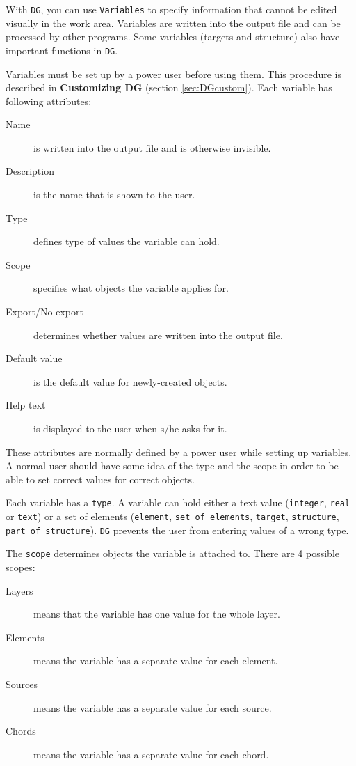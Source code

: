 \documentclass[a4paper,10pt]{report}
\begin{document}
With {\tt DG}, you can use {\tt Variables} to specify information that cannot be
edited visually in the work area. Variables are written into the
output file and can be processed by other programs. Some variables
(targets and structure) also have important functions in {\tt DG}.

Variables must be set up by a power user before using them. This
procedure is described in {\bf Customizing DG} (section \ref{sec:DGcustom}). Each variable has
following attributes:
\begin{description}
\item[Name] is written into the output file
  and is otherwise invisible.
\item[Description] is the name that is
  shown to the user.
\item[Type] defines type of values the
  variable can hold.
\item[Scope] specifies what objects the
  variable applies for.
\item[Export/No export] determines whether values are written into the output file.
\item[Default value] is the
  default value for newly-created objects.
\item[Help text] is displayed to the
  user when s/he asks for it.
\end{description}

These attributes are normally defined by a power user while setting up
variables. A normal user should have some idea of the type and the
scope in order to be able to set correct values for correct objects.

Each variable has a {\tt type}. A variable can hold either a text
value ({\tt integer}, {\tt real} or {\tt text}) or a set of
elements ({\tt element}, {\tt set of elements}, {\tt target},
{\tt structure}, {\tt part of structure}). {\tt DG} prevents the user from
entering values of a wrong type.

The {\tt scope} determines objects the variable is attached to. There
are 4 possible scopes:
\begin{description}
 \item[Layers] means that the variable has one value for the whole
  layer.
\item[Elements] means the variable has a separate value for each
  element.
\item[Sources] means the variable has a separate value for each
  source.
\item[Chords] means the variable has a separate value for
each chord.
\end{description}
\end{document}
